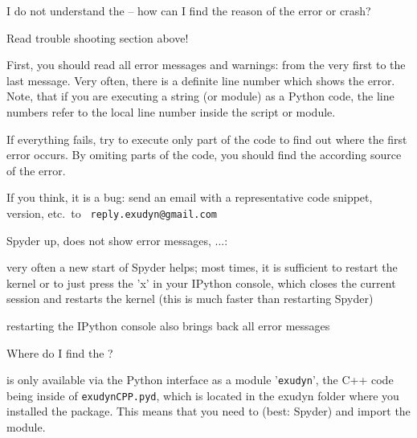 \ei
\item I do not understand the  -- how can I find the reason of the error or crash?
\bi
\item[$\ra$] Read trouble shooting section above! 
\item[$\ra$] First, you should read all error messages and warnings: from the very first to the last message. Very often, there is a definite line number which shows the error. Note, that if you are executing a string (or module) as a Python code, the line numbers refer to the local line number inside the script or module.
\item[$\ra$] If everything fails, try to execute only part of the code to find out where the first error occurs. By omiting parts of the code, you should find the according source of the error.
\item[$\ra$] If you think, it is a bug: send an email with a representative code snippet, version, etc.\ to \texttt{ reply.exudyn@gmail.com}
\ei
\item Spyder  up, does not show error messages, ...:
\bi
\item[$\ra$] very often a new start of Spyder helps; most times, it is sufficient to restart the kernel or to just press the 'x' in your IPython console, which closes the current session and restarts the kernel (this is much faster than restarting Spyder)
\item[$\ra$] restarting the IPython console also brings back all error messages
\ei
\item Where do I find the ?
\bi
\item[$\ra$] \codeName is only available via the Python interface as a module '\texttt{exudyn}', the C++ code being inside of \texttt{exudynCPP.pyd}, which is located in the exudyn folder where you installed the package. This means that you need to  (best: Spyder) and import the \codeName module.
\ei
